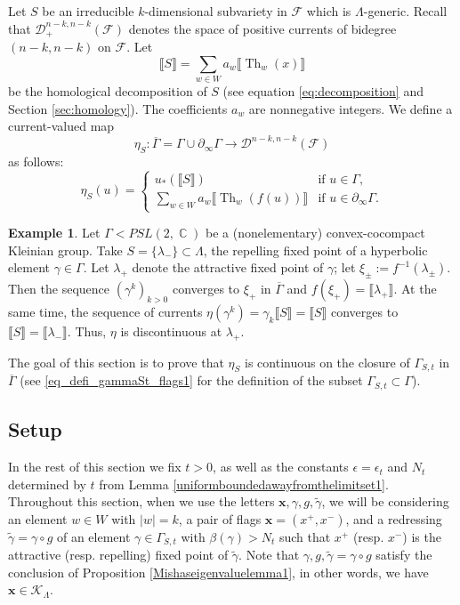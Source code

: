 \documentclass[12pt]{amsbook}%
\theoremstyle{definition}
\newtheorem{example}[thm]{Example}
\theoremstyle{remark}
\numberwithin{section}{chapter}
\numberwithin{subsection}{section}
\numberwithin{figure}{chapter}
\DeclareMathOperator{\C}{\mathbb{C}}
\DeclareMathOperator{\Th}{Th}
\newcommand\intcur[1]{\llbracket #1 \rrbracket}
\def\cF{{\mathscr{F}}}
\def\sK{{\mathscr{K}}}
\def\xpair{{(x^+,x^-)}}
\def\tga{{\tilde{\gamma}}}
\def\bx{\mathbf{x}}
\def\Ga{\Gamma}
\def\ga{\gamma}
\def\La{\Lambda}
\def\la{\lambda}
\def\geo{\partial_\infty}
\def\ol{\overline}
\begin{document}
{{Let $S$ be an irreducible $k$-dimensional subvariety  in $\cF$ which is $\Lambda$-generic. 
Recall that $\mathcal{D}^{n-k,n-k}_+(\cF)$ denotes the space of positive currents of bidegree $(n-k,n-k)$ on $\cF$. Let 
\[ \intcur{S}=\sum_{w\in W}a_w \intcur{\Th_w(x)}\]
be the homological decomposition of $S$ (see equation \eqref{eq:decomposition} and Section \ref{sec:homology}). 
The coefficients $a_w$ are nonnegative integers. We define a current-valued map 
\[
\eta_S: \ol{\Ga}= \Gamma\cup \geo \Gamma\rightarrow \mathcal{D}^{n-k,n-k}(\cF)
\] 
as follows:
\begin{equation}\label{eq:eta_flags1}
\eta_S(u) = \left  \lbrace
\begin{array}{ll}
u_*(\llbracket S\rrbracket ) & \text{if } u\in \Gamma,\\
 \sum_{w\in W} a_w \llbracket \Th_{w}(f(u))\rrbracket  &\text{if }u\in \geo \Gamma.
\end{array} \right .
\end{equation}

\begin{example}\label{ex:discontinuous}
Let $\Ga< PSL(2,\C)$ be a (nonelementary) convex-cocompact Kleinian group. Take $S=\{\la_-\}\subset \La$, the repelling fixed point 
of a hyperbolic element $\ga\in\Ga$.  Let  $\la_+$ denote the attractive fixed point of $\ga$; let $\xi_\pm:=f^{-1}(\la_\pm)$. 
Then the sequence $(\ga^k)_{k>0}$ converges to $\xi_+$ in $\ol\Ga$ and $f(\xi_+)=\llbracket \la_+\rrbracket$. 
At the same time, the sequence of currents $\eta(\ga^k)=\ga_k \llbracket S\rrbracket=\llbracket S\rrbracket$ converges to 
$\llbracket S\rrbracket=\llbracket \la_-\rrbracket$. Thus, $\eta$ is discontinuous at $\la_+$. 
\end{example}

The goal of this section is to prove that $\eta_S$ is continuous on the closure of $\Gamma_{S,t}$ in $\ol\Ga$ (see \eqref{eq_defi_gammaSt_flags1} for 
the definition of the subset $\Gamma_{S,t}\subset \Ga$). 





\subsection{Setup}\label{sec:hypothesis_cylinder_stretch}
In the rest of this section we fix $t>0$, as well as the constants $\epsilon=\epsilon_t$ and $N_t$ determined by $t$ from Lemma \ref{uniformboundedawayfromthelimitset1}.
Throughout this section, when we use the letters $\bx,\gamma,g,\tga$, we will be considering an element $w\in W$ with $\vert w\vert=k$, a pair of flags $\bx=\xpair$, and a redressing $\tga=\gamma\circ g$ of an element $\gamma\in \Gamma_{S,t}$ with $\beta(\gamma)>N_t$ such that $x^+$ (resp. $x^-$) is the attractive (resp. repelling) fixed point of $\tga$. Note that $\gamma,g,\tilde{\gamma}=\gamma\circ g$ satisfy the conclusion of Proposition \ref{Mishaseigenvaluelemma1}, in other words, we have $\bx\in \sK_\Lambda$.

}}
\end{document}

